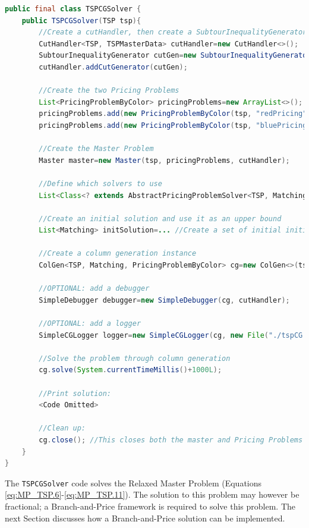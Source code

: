 \documentclass[a4paper]{article}
\newenvironment{myblock}[1]{%
    \tcolorbox[beamer,%
    noparskip,breakable,
    colback=lightBlueCodeBlock,colframe=darkBlueCodeBlock,%
    colbacklower=darkBlueCodeBlock!75!lightBlueCodeBlock,%
    coltitle=blueTitleCodeBlock,
    title=#1]}%
    {\endtcolorbox}
\newcommand{\code}[1]{\lstinline[language=java, style=seminar]!#1!}
\begin{document}
\begin{myblock}{TSPCGSolver}
\begin{lstlisting}[language=java, style=eclipseArticle, xleftmargin=2em]  
public final class TSPCGSolver {
	public TSPCGSolver(TSP tsp){
		//Create a cutHandler, then create a SubtourInequalityGenerator and add it to the handler
		CutHandler<TSP, TSPMasterData> cutHandler=new CutHandler<>();
		SubtourInequalityGenerator cutGen=new SubtourInequalityGenerator(tsp);
		cutHandler.addCutGenerator(cutGen);

		//Create the two Pricing Problems
		List<PricingProblemByColor> pricingProblems=new ArrayList<>();
		pricingProblems.add(new PricingProblemByColor(tsp, "redPricing", MatchingColor.RED));
		pricingProblems.add(new PricingProblemByColor(tsp, "bluePricing", MatchingColor.BLUE));

		//Create the Master Problem
		Master master=new Master(tsp, pricingProblems, cutHandler);
		
		//Define which solvers to use
		List<Class<? extends AbstractPricingProblemSolver<TSP, Matching, PricingProblemByColor>>> solvers= Collections.singletonList(ExactPricingProblemSolver.class);
		
		//Create an initial solution and use it as an upper bound
		List<Matching> initSolution=... //Create a set of initial initialColumns.

		//Create a column generation instance
		ColGen<TSP, Matching, PricingProblemByColor> cg=new ColGen<>(tsp, master, pricingProblems, solvers, initSolution, tourLengthInitSolution);

		//OPTIONAL: add a debugger
		SimpleDebugger debugger=new SimpleDebugger(cg, cutHandler);

		//OPTIONAL: add a logger
		SimpleCGLogger logger=new SimpleCGLogger(cg, new File("./tspCG.log"));

		//Solve the problem through column generation
		cg.solve(System.currentTimeMillis()+1000L);

		//Print solution:
		<Code Omitted>

		//Clean up:
		cg.close(); //This closes both the master and Pricing Problems
	}
}
\end{lstlisting}
\end{myblock}
The \code{TSPCGSolver} code solves the Relaxed Master Problem (Equations \eqref{eq:MP_TSP.6}-\eqref{eq:MP_TSP.11}). The solution to this problem may however be fractional; a Branch-and-Price framework is required to solve this problem. The next Section discusses how a Branch-and-Price solution can be implemented.
\end{document}
